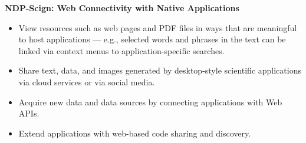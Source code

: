 \begin{frame}{\Huge{\textbf{NDP-Scign: Web Connectivity with Native Applications}}}
	
\vspace{-1.05em}

%		


	
	
\vspace{.35em}
	
\begin{minipage}{\textwidth}
	
	\begin{itemize}
		\setItemLengthMid
		
\item  View resources such as web pages and PDF files in ways that are meaningful to 
host applications --- e.g., selected words and phrases in the text can 
be linked via context menus to application-specific searches.

\item  Share text, data, and images generated by desktop-style scientific 
applications via cloud services or via social media.

\item  \begin{minipage}[t]{0.45\textwidth}
Acquire new data and data sources by connecting applications with Web APIs.
\end{minipage}

\item  
\begin{minipage}[t]{0.45\textwidth}
Extend applications with web-based code sharing and discovery.
\end{minipage}		
  
	\end{itemize}

	\end{minipage}

\vspace{-7em}
\begin{flushright}
\hspace*{0.5em}
\end{flushright}

	
\end{frame} 
 
